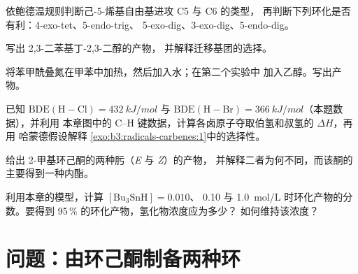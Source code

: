 \begin{exercise}[$\star\star$]\label{exo:b3:radicals-carbenes:7}
依鲍德温规则判断己-5-烯基自由基进攻 C5 与 C6 的类型，
再判断下列环化是否有利：4-exo-tet、5-endo-trig、
5-exo-dig、3-exo-dig、5-endo-dig。
\end{exercise}

\begin{exercise}[$\star\star$]\label{exo:b3:radicals-carbenes:8}
写出 2,3-二苯基丁-2,3-二醇的产物，
并解释迁移基团的选择。
\end{exercise}

\begin{exercise}[$\star\star$]\label{exo:b3:radicals-carbenes:9}
将苯甲酰叠氮在甲苯中加热，然后加入水；在第二个实验中
加入乙醇。写出产物。
\end{exercise}

\begin{exercise}[$\star\star\star$]\label{exo:b3:radicals-carbenes:10}
已知 $\mathrm{BDE(H{-}Cl)} = \qty{432}{kJ/mol}$ 与 $\mathrm{BDE(H{-}Br)} = \qty{366}{kJ/mol}$（本题数据），并利用
本章图中的 C--H 键数据，计算各卤原子夺取伯氢和叔氢的 $\Delta H$，再用
哈蒙德假设解释
\cref{exo:b3:radicals-carbenes:1}中的选择性。
\end{exercise}

\begin{exercise}[$\star\star\star$]\label{exo:b3:radicals-carbenes:11}
给出 2-甲基环己酮的两种肟（\textit{E} 与 \textit{Z}）的产物，
并解释二者为何不同，而该酮的
主要得到一种内酯。
\end{exercise}

\begin{exercise}[$\star\star\star$]\label{exo:b3:radicals-carbenes:12}
利用本章的模型，计算 $[\mathrm{Bu_3SnH}] = 0.010$、
0.10 与 \qty{1.0}{mol/L} 时环化产物的分数。要得到 95\,\% 的环化产物，氢化物浓度应为多少？
如何维持该浓度？
\end{exercise}

\section{问题：由环己酮制备两种环}

